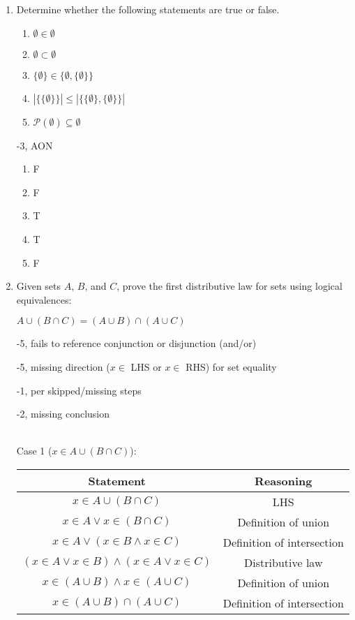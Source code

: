\begin{enumerate}
\item Determine whether the following statements are true or false. 

\begin{enumerate}
    \item $\emptyset \in \emptyset$
    \item $\emptyset \subset \emptyset$
    \item $\{\emptyset\} \in \{\emptyset,\{\emptyset\}\}$
    \item $|\{\{\emptyset\}\}| \leq |\{\{\emptyset\}, \{\emptyset\}\}|$
    \item $\mathcal{P}(\emptyset) \subseteq \emptyset$
\end{enumerate}

\begin{rubric}
-3, AON
\end{rubric}

\begin{solution}
\begin{enumerate}
    \item F
    \item F
    \item T
    \item T
    \item F
\end{enumerate}
\end{solution}

\item Given sets $A$, $B$, and $C$, prove the first distributive law for sets using logical equivalences:   
\begin{center}
    $A \cup (B \cap C) = (A \cup B) \cap (A \cup C)$
\end{center}

\begin{rubric}
-5, fails to reference conjunction or disjunction (and/or)

-5, missing direction ($x \in $ LHS or $x \in $ RHS) for set equality

-1, per skipped/missing steps

-2, missing conclusion

\end{rubric}

\begin{solution}\\
Case 1 ($x \in A \cup (B \cap C)$):\\
\begin{tabular}{c|c}
    Statement & Reasoning \\
    \hline
    $x \in A \cup (B \cap C)$ & LHS \\
    $x \in A \lor x \in (B \cap C)$ & Definition of union \\
    $x \in A \lor (x \in B \land x \in C)$ & Definition of intersection \\
    $(x \in A \lor x \in B) \land (x \in A \lor x \in C)$ & Distributive law \\
    $x \in (A \cup B) \land x \in (A \cup C)$ & Definition of union \\
    $x \in (A \cup B) \cap (A \cup C)$ & Definition of intersection \\
    

\end{tabular}
\end{solution}
\end{enumerate}
